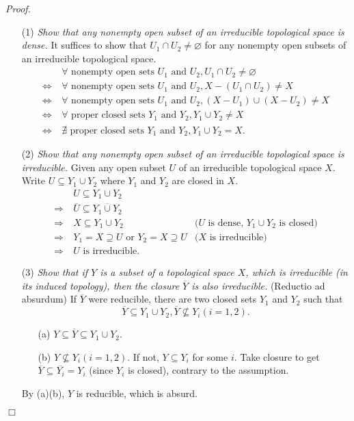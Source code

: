 \documentclass{article}
\begin{document}
\emph{Proof.}
\begin{enumerate}
\item[(1)]
\emph{Show that any nonempty open subset of an irreducible topological space
is dense.}
It suffices to show that $U_1 \cap U_2 \neq \varnothing$ for any
nonempty open subsets of an irreducible topological space.
  \begin{align*}
  & \: \forall \text{ nonempty open sets } U_1 \text{ and } U_2,
  U_1 \cap U_2 \neq \varnothing \\
  \Longleftrightarrow& \:
  \forall \text{ nonempty open sets } U_1 \text{ and } U_2,
  X - (U_1 \cap U_2) \neq X \\
  \Longleftrightarrow& \:
  \forall \text{ nonempty open sets } U_1 \text{ and } U_2,
  (X - U_1) \cup (X - U_2) \neq X \\
  \Longleftrightarrow& \:
  \forall \text{ proper closed sets } Y_1 \text{ and } Y_2,
  Y_1 \cup Y_2 \neq X \\
  \Longleftrightarrow& \:
  \nexists \text{ proper closed sets } Y_1 \text{ and } Y_2,
  Y_1 \cup Y_2 = X.
  \end{align*}
\item[(2)]
\emph{Show that any nonempty open subset of an irreducible topological space
is irreducible.}
Given any open subset $U$ of an irreducible topological space $X$.
Write $U \subseteq Y_1 \cup Y_2$ where $Y_1$ and $Y_2$ are closed in $X$.
  \begin{align*}
  & \: U \subseteq Y_1 \cup Y_2 \\
  \Longrightarrow& \:
  \overline{U} \subseteq \overline{Y_1 \cup Y_2} \\
  \Longrightarrow& \:
  X \subseteq Y_1 \cup Y_2
    &\text{($U$ is dense, $Y_1 \cup Y_2$ is closed)} \\
  \Longrightarrow& \:
  Y_1 = X \supseteq U \text{ or } Y_2 = X \supseteq U
    &\text{($X$ is irreducible)} \\
  \Longrightarrow& \:
  \text{$U$ is irreducible.}
  \end{align*}
\item[(3)]
\emph{Show that if $Y$ is a subset of a topological space $X$,
which is irreducible (in its induced topology),
then the closure $\overline{Y}$ is also irreducible.}
(Reductio ad absurdum)
If $\overline{Y}$ were reducible, there are two closed sets $Y_1$ and $Y_2$
such that
$$\overline{Y} \subseteq Y_1 \cup Y_2,
\overline{Y} \not\subseteq Y_i (i = 1, 2).$$
  \begin{enumerate}
  \item[(a)]
  $Y \subseteq \overline{Y} \subseteq Y_1 \cup Y_2$.
  \item[(b)]
  $Y\not\subseteq Y_i (i = 1, 2)$. If not, $Y \subseteq Y_i$ for some $i$.
  Take closure to get $\overline{Y} \subseteq \overline{Y_i} = Y_i$ (since $Y_i$ is closed),
  contrary to the assumption.
  \end{enumerate}
  By (a)(b), $Y$ is reducible, which is absurd.
\end{enumerate}
$\Box$ \\
\end{document}
